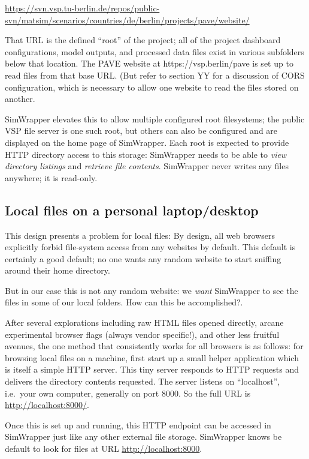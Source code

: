 \url{https://svn.vsp.tu-berlin.de/repos/public-svn/matsim/scenarios/countries/de/berlin/projects/pave/website/}

That URL is the defined ``root'' of the project; all of the project
dashboard configurations, model outputs, and processed data files exist
in various subfolders below that location. The PAVE website at
https://vsp.berlin/pave is set up to read files from that base URL. (But
refer to section YY for a discussion of CORS configuration, which is
necessary to allow one website to read the files stored on another.

SimWrapper elevates this to allow multiple configured root filesystems;
the public VSP file server is one such root, but others can also be
configured and are displayed on the home page of SimWrapper. Each root
is expected to provide HTTP directory access to this storage: SimWrapper
needs to be able to \emph{view directory listings} and \emph{retrieve
file contents}. SimWrapper never writes any files anywhere; it is
read-only.

\hypertarget{local-files-on-a-personal-laptopdesktop}{%
\subsection{Local files on a personal
laptop/desktop}\label{local-files-on-a-personal-laptopdesktop}}

This design presents a problem for local files: By design, all web
browsers explicitly forbid file-system access from any websites by
default. This default is certainly a good default; no one wants any
random website to start sniffing around their home directory.

But in our case this is not any random website: we \emph{want}
SimWrapper to see the files in some of our local folders. How can this
be accomplished?.

After several explorations including raw HTML files opened directly,
arcane experimental browser flags (always vendor specific!), and other
less fruitful avenues, the one method that consistently works for all
browsers is as follows: for browsing local files on a machine, first
start up a small helper application which is itself a simple HTTP
server. This tiny server responds to HTTP requests and delivers the
directory contents requested. The server listens on ``localhost'',
i.e.~your own computer, generally on port 8000. So the full URL is
\url{http://localhost:8000/}.

Once this is set up and running, this HTTP endpoint can be accessed in
SimWrapper just like any other external file storage. SimWrapper knows
be default to look for files at URL \url{http://localhost:8000}.


